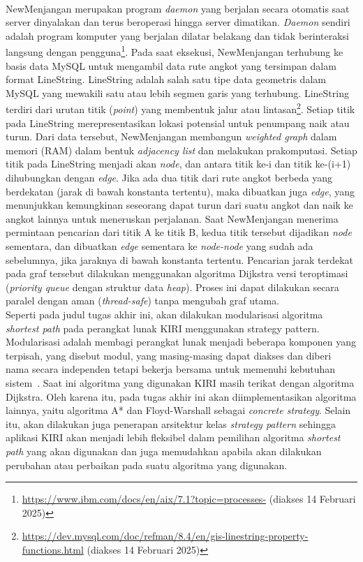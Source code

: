 \\
NewMenjangan merupakan program \textit{daemon} yang berjalan secara otomatis saat server dinyalakan dan terus beroperasi hingga server dimatikan. \textit{Daemon} sendiri adalah program komputer yang berjalan dilatar belakang dan tidak berinteraksi langsung dengan pengguna\footnote{\url{https://www.ibm.com/docs/en/aix/7.1?topic=processes-} (diakses 14 Februari 2025)}. Pada saat eksekusi, NewMenjangan terhubung ke basis data MySQL untuk mengambil data rute angkot yang tersimpan dalam format LineString. LineString adalah salah satu tipe data geometris dalam MySQL yang mewakili satu atau lebih segmen garis yang terhubung. LineString terdiri dari urutan titik (\textit{point}) yang membentuk jalur atau lintasan\footnote{\url{https://dev.mysql.com/doc/refman/8.4/en/gis-linestring-property-functions.html} (diakses 14 Februari 2025)}. Setiap titik pada LineString merepresentasikan lokasi potensial untuk penumpang naik atau turun. Dari data tersebut, NewMenjangan membangun \textit{weighted graph} dalam memori (RAM) dalam bentuk \textit{adjacency list} dan melakukan prakomputasi. Setiap titik pada LineString menjadi akan \textit{node}, dan antara titik ke-i dan titik ke-(i+1) dihubungkan dengan \textit{edge}. Jika ada dua titik dari rute angkot berbeda yang berdekatan (jarak di bawah konstanta tertentu), maka dibuatkan juga \textit{edge}, yang menunjukkan kemungkinan seseorang dapat turun dari suatu angkot dan naik ke angkot lainnya untuk meneruskan perjalanan. 
\newpage
\noindent
Saat NewMenjangan menerima permintaan pencarian dari titik A ke titik B, kedua titik tersebut dijadikan \textit{node} sementara, dan dibuatkan \textit{edge} sementara ke \textit{node-node} yang sudah ada sebelumnya, jika jaraknya di bawah konstanta tertentu. Pencarian jarak terdekat pada graf tersebut dilakukan menggunakan algoritma Dijkstra versi teroptimasi (\textit{priority queue} dengan struktur data \textit{heap}). Proses ini dapat dilakukan secara paralel dengan aman (\textit{thread-safe}) tanpa mengubah graf utama.
\\
Seperti pada judul tugas akhir ini, akan dilakukan modularisasi algoritma \textit{shortest path} pada perangkat lunak KIRI menggunakan strategy pattern. Modularisasi adalah membagi perangkat lunak menjadi beberapa komponen yang terpisah, yang disebut modul, yang masing-masing dapat diakses dan diberi nama secara independen tetapi bekerja bersama untuk memenuhi kebutuhan sistem~\cite{Pressman:19:Software}. Saat ini algoritma yang digunakan KIRI masih terikat dengan algoritma Dijkstra. Oleh karena itu, pada tugas akhir ini akan diimplementasikan algoritma lainnya, yaitu algoritma A* dan Floyd-Warshall sebagai \textit{concrete strategy}. Selain itu, akan dilakukan juga penerapan arsitektur kelas \textit{strategy pattern} sehingga aplikasi KIRI akan menjadi lebih fleksibel dalam pemilihan algoritma \textit{shortest path} yang akan digunakan dan juga memudahkan apabila akan dilakukan perubahan atau perbaikan pada suatu algoritma yang digunakan.

